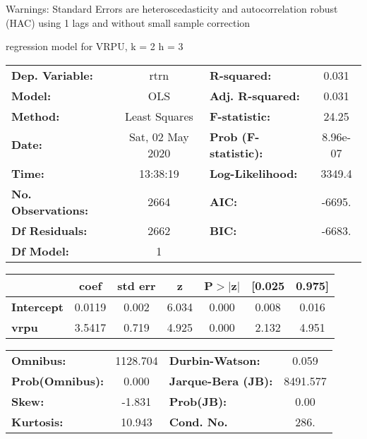 Warnings: \newline
 [1] Standard Errors are heteroscedasticity and autocorrelation robust (HAC) using 1 lags and without small sample correction\ 

regression model for VRPU, k = 2 h = 3\begin{center}
\begin{tabular}{lclc}
\toprule
\textbf{Dep. Variable:}    &       rtrn       & \textbf{  R-squared:         } &     0.031   \\
\textbf{Model:}            &       OLS        & \textbf{  Adj. R-squared:    } &     0.031   \\
\textbf{Method:}           &  Least Squares   & \textbf{  F-statistic:       } &     24.25   \\
\textbf{Date:}             & Sat, 02 May 2020 & \textbf{  Prob (F-statistic):} &  8.96e-07   \\
\textbf{Time:}             &     13:38:19     & \textbf{  Log-Likelihood:    } &    3349.4   \\
\textbf{No. Observations:} &        2664      & \textbf{  AIC:               } &    -6695.   \\
\textbf{Df Residuals:}     &        2662      & \textbf{  BIC:               } &    -6683.   \\
\textbf{Df Model:}         &           1      & \textbf{                     } &             \\
\bottomrule
\end{tabular}
\begin{tabular}{lcccccc}
                   & \textbf{coef} & \textbf{std err} & \textbf{z} & \textbf{P$> |$z$|$} & \textbf{[0.025} & \textbf{0.975]}  \\
\midrule
\textbf{Intercept} &       0.0119  &        0.002     &     6.034  &         0.000        &        0.008    &        0.016     \\
\textbf{vrpu}      &       3.5417  &        0.719     &     4.925  &         0.000        &        2.132    &        4.951     \\
\bottomrule
\end{tabular}
\begin{tabular}{lclc}
\textbf{Omnibus:}       & 1128.704 & \textbf{  Durbin-Watson:     } &    0.059  \\
\textbf{Prob(Omnibus):} &   0.000  & \textbf{  Jarque-Bera (JB):  } & 8491.577  \\
\textbf{Skew:}          &  -1.831  & \textbf{  Prob(JB):          } &     0.00  \\
\textbf{Kurtosis:}      &  10.943  & \textbf{  Cond. No.          } &     286.  \\
\bottomrule
\end{tabular}
\end{center}

